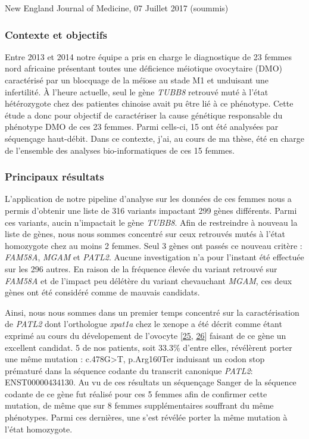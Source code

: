 \documentclass[12pt,twoside]{reedthesis}
\theoremstyle{definition}
\theoremstyle{definition}
\theoremstyle{remark}
\begin{document}
  New England Journal of Medicine, 07 Juillet 2017 (soummis)
  
  \newpage
  
  \subsubsection{Contexte et objectifs}\label{contexte-et-objectifs-3}
  
  Entre 2013 et 2014 notre équipe a pris en charge le diagnostique de 23
  femmes nord africaine présentant toutes une déficience méiotique
  ovocytaire (DMO) caractérisé par un blocquage de la méïose au stade M1
  et unduisant une infertilité. À l'heure actuelle, seul le gène
  \emph{TUBB8} retrouvé muté à l'état hétérozygote chez des patientes
  chinoise avait pu être lié à ce phénotype. Cette étude a donc pour
  objectif de caractériser la cause génétique responsable du phénotype DMO
  de ces 23 femmes. Parmi cells-ci, 15 ont été analysées par séquençage
  haut-débit. Dans ce contexte, j'ai, au cours de ma thèse, été en charge
  de l'ensemble des analyses bio-informatiques de ces 15 femmes.
  
  \newpage
  
  
  
  \newpage
  
  \subsubsection{Principaux résultats}\label{principaux-resultats-3}
  
  L'application de notre pipeline d'analyse sur les données de ces femmes
  nous a permis d'obtenir une liste de 316 variants impactant 299 gènes
  différents. Parmi ces variants, aucin n'impactait le gène \emph{TUBB8}.
  Afin de restreindre à nouveau la liste de gènes, nous nous sommes
  concentré sur ceux retrouvés mutés à l'état homozygote chez au moins 2
  femmes. Seul 3 gènes ont passés ce nouveau critère : \emph{FAM58A},
  \emph{MGAM} et \emph{PATL2}. Aucune investigation n'a pour l'instant été
  effectuée sur les 296 autres. En raison de la fréquence élevée du
  variant retrouvé sur \emph{FAM58A} et de l'impact peu délétère du
  variant chevauchant \emph{MGAM}, ces deux gènes ont été considéré comme
  de mauvais candidats.
  
  Ainsi, nous nous sommes dans un premier temps concentré sur la
  caractérisation de \emph{PATL2} dont l'orthologue \emph{xpat1a} chez le
  xenope a été décrit comme étant exprimé au cours du dévelopement de
  l'ovocyte {[}\protect\hyperlink{ref-Marnef2010}{25},
  \protect\hyperlink{ref-Nakamura2010}{26}{]} faisant de ce gène un
  excellent candidat. 5 de nos patients, soit 33.3\% d'entre elles,
  révélèrent porter une même mutation : c.478G\textgreater{}T, p.Arg160Ter
  induisant un codon stop prématuré dans la séquence codante du transcrit
  canonique \emph{PATL2}: ENST00000434130. Au vu de ces résultats un
  séquençage Sanger de la séquence codante de ce gène fut réalisé pour ces
  5 femmes afin de confirmer cette mutation, de même que sur 8 femmes
  supplémentaires souffrant du même phénotypes. Parmi ces dernières, une
  s'est révélée porter la même mutation à l'état homozygote.
  
\end{document}
